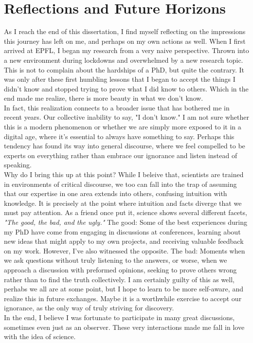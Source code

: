 \cleardoublepage
{}
\renewcommand{\chaptercolor}{custom_purple}
\chapter*{Reflections and Future Horizons}

As I reach the end of this dissertation, I find myself reflecting on the impressions this journey has left on me, and perhaps on my own actions as well.
When I first arrived at EPFL, I began my research from a very naive perspective.
Thrown into a new environment during lockdowns and overwhelmed by a new research topic.
This is not to complain about the hardships of a PhD, but quite the contrary.
It was only after these first humbling lessons that I began to accept the things I didn’t know and stopped trying to prove what I did know to others.
Which in the end made me realize, there is more beauty in what we don't know.\\
In fact, this realization connects to a broader issue that has bothered me in recent years.
Our collective inability to say, "I don't know."
I am not sure whether this is a modern phenomenon or whether we are simply more exposed to it in a digital age, where it's essential to always have something to say.
Perhaps this tendency has found its way into general discourse, where we feel compelled to be experts on everything rather than embrace our ignorance and listen instead of speaking.\\

Why do I bring this up at this point?
While I beleive that, scientists are trained in environments of critical discourse, we too can fall into the trap of assuming that our expertise in one area extends into others, confusing intuition with knowledge.
It is precisely at the point where intuition and facts diverge that we must pay attention.
As a friend once put it, science shows several different facets, \textit{"The good, the bad, and the ugly."}
The good: Some of the best experiences during my PhD have come from engaging in discussions at conferences, learning about new ideas that might apply to my own projects, and receiving valuable feedback on my work.
However, I’ve also witnessed the opposite.
The bad: Moments when we ask questions without truly listening to the answers, or worse, when we approach a discussion with preformed opinions, seeking to prove others wrong rather than to find the truth collectively.
I am certainly guilty of this as well, perhabs we all are at some point, but I hope to learn to be more self-aware, and realize this in future exchanges.
Maybe it is a worthwhile exercise to accept our ignorance, as the only way of truly striving for discovery.\\
In the end, I believe I was fortunate to participate in many great discussions, sometimes even just as an observer.
These very interactions made me fall in love with the idea of science.\hfill\break


